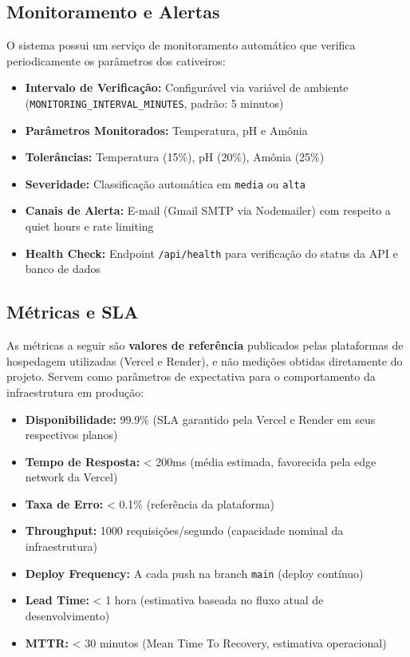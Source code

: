 \documentclass[11pt,a4paper]{article}
\begin{document}
\subsection{Monitoramento e Alertas}
O sistema possui um serviço de monitoramento automático que verifica periodicamente os parâmetros dos cativeiros:
\begin{itemize}
    \item \textbf{Intervalo de Verificação:} Configurável via variável de ambiente (\texttt{MONITORING\_INTERVAL\_MINUTES}, padrão: 5 minutos)
    \item \textbf{Parâmetros Monitorados:} Temperatura, pH e Amônia
    \item \textbf{Tolerâncias:} Temperatura (15\%), pH (20\%), Amônia (25\%)
    \item \textbf{Severidade:} Classificação automática em \texttt{media} ou \texttt{alta}
    \item \textbf{Canais de Alerta:} E-mail (Gmail SMTP via Nodemailer) com respeito a quiet hours e rate limiting
    \item \textbf{Health Check:} Endpoint \texttt{/api/health} para verificação do status da API e banco de dados
\end{itemize}

\subsection{Métricas e SLA}

As métricas a seguir são \textbf{valores de referência} publicados pelas plataformas de hospedagem utilizadas (Vercel e Render), e não medições obtidas diretamente do projeto. Servem como parâmetros de expectativa para o comportamento da infraestrutura em produção:

\begin{itemize}
    \item \textbf{Disponibilidade:} 99.9\% (SLA garantido pela Vercel e Render em seus respectivos planos)
    \item \textbf{Tempo de Resposta:} < 200ms (média estimada, favorecida pela edge network da Vercel)
    \item \textbf{Taxa de Erro:} < 0.1\% (referência da plataforma)
    \item \textbf{Throughput:} 1000 requisições/segundo (capacidade nominal da infraestrutura)
    \item \textbf{Deploy Frequency:} A cada push na branch \texttt{main} (deploy contínuo)
    \item \textbf{Lead Time:} < 1 hora (estimativa baseada no fluxo atual de desenvolvimento)
    \item \textbf{MTTR:} < 30 minutos (Mean Time To Recovery, estimativa operacional)
\end{itemize}
\end{document}
